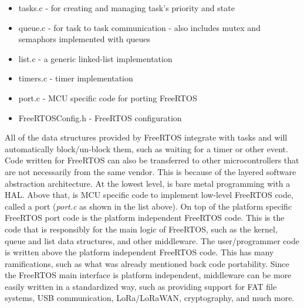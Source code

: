 \begin{itemize}
	\item tasks.c - for creating and managing task's priority and state
	\item queue.c - for task to task communication - also includes mutex and
		semaphors implemented with queues
	\item list.c - a generic linked-list implementation
	\item timers.c - timer implementation
	\item port.c - MCU specific code for porting FreeRTOS
	\item FreeRTOSConfig.h - FreeRTOS configuration
\end{itemize}

All of the data structures provided by FreeRTOS integrate with tasks and will
automatically block/un-block them, such as waiting for a timer or other event.
Code written for FreeRTOS can also be transferred to other microcontrollers that
are not necessarily from the same vendor. This is because of the layered
software abstraction architecture. At the lowest level, is bare metal
programming with a HAL. Above that, is MCU specific code to implement low-level
FreeRTOS code, called a port (\emph{port.c} as shown in the list above). On top
of the platform specific FreeRTOS port code is the platform independent FreeRTOS
code. This is the code that is responsibly for the main logic of FreeRTOS, such
as the kernel, queue and list data structures, and other middleware. The
user/programmer code is written above the platform independent FreeRTOS code.
This has many ramifications, such as what was already mentioned back code
portability. Since the FreeRTOS main interface is platform independent,
middleware can be more easily written in a standardized way, such as providing
support for FAT file systems, USB communication, LoRa/LoRaWAN, cryptography, and
much more.

